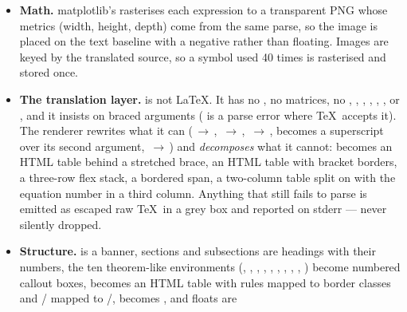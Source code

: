 \begin{itemize}
  \item \textbf{Math.} matplotlib's  rasterises each expression to a
    transparent PNG whose metrics (width, height, depth) come from the same parse, so the
    image is placed on the text baseline with a negative  rather than
    floating. Images are keyed by the translated source, so a symbol used 40 times is
    rasterised and stored once.
  \item \textbf{The translation layer.}  is not LaTeX. It has no
    , no matrices, no ,
    , ,
    , ,
    ,  or
    , and it insists on braced arguments
    ( is a parse error where \TeX\ accepts it). The renderer
    rewrites what it can (\,$\to$\,,
    \,$\to$\,,
    \,$\to$\,,
     becomes a superscript over its second argument,
    \,$\to$\,) and
    \emph{decomposes} what it cannot:  becomes an HTML table behind a stretched
    brace,  an HTML table with bracket borders,
     a three-row flex stack,
     a bordered span,  a two-column table split
    on \code{\&} with the equation number in a third column. Anything that still fails to
    parse is emitted as escaped raw \TeX\ in a grey box and reported on stderr --- never
    silently dropped.
  \item \textbf{Structure.}  is a banner, sections and
    subsections are headings with their numbers, the ten theorem-like environments
    (, , , ,
    , , , , ,
    ) become numbered callout boxes,  becomes an HTML table with
     rules mapped to border classes and
    / mapped to
    /,  becomes , and floats are

\end{itemize}
